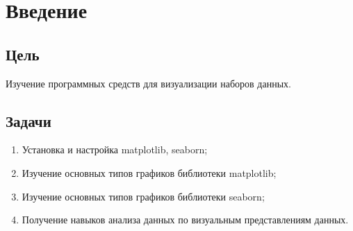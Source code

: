 \chapter{Введение}
\label{ch:intro}

\section{Цель}  

Изучение программных средств для
визуализации наборов данных.


\section{Задачи}

\begin{enumerate}
\item Установка и настройка matplotlib, seaborn;
\item Изучение основных типов графиков библиотеки matplotlib;
\item Изучение основных типов графиков библиотеки seaborn;
\item Получение навыков анализа данных по визуальным представлениям данных.

\end{enumerate}
  
\endinput 
